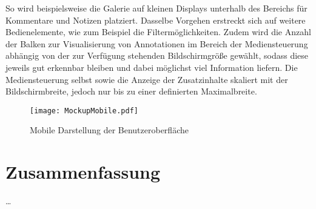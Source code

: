 So wird beispielsweise die Galerie auf kleinen Displays unterhalb des Bereichs für Kommentare und Notizen platziert. Dasselbe Vorgehen erstreckt sich auf weitere Bedienelemente, wie zum Beispiel die Filtermöglichkeiten. Zudem wird die Anzahl der Balken zur Visualisierung von Annotationen im Bereich der Mediensteuerung abhängig von der zur Verfügung stehenden Bildschirmgröße gewählt, sodass diese jeweils gut erkennbar bleiben und dabei möglichst viel Information liefern. Die Mediensteuerung selbst sowie die Anzeige der Zusatzinhalte skaliert mit der Bildschirmbreite, jedoch nur bis zu einer definierten Maximalbreite.

\begin{figure}[h!]
\texttt{[image: MockupMobile.pdf]}
\caption{\label{fig:MockupMobile} Mobile Darstellung der Benutzeroberfläche}
\end{figure}

\section{Zusammenfassung}
\dots

